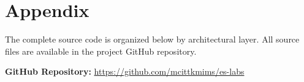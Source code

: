 \section{Appendix}

The complete source code is organized below by architectural layer. All source files are available in the project GitHub repository.

\textbf{GitHub Repository:} \url{https://github.com/mcittkmims/es-labs}


%
%
%
%
%
%
%
%
%
%
